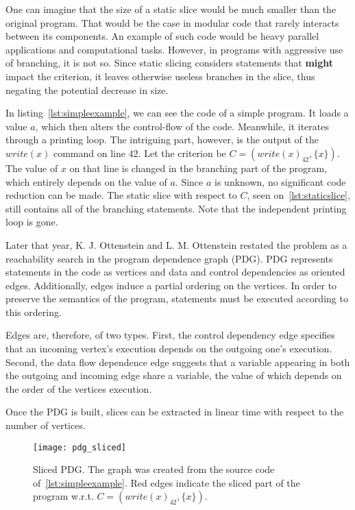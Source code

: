 One can imagine that the size of a static slice would be much smaller
than the original program. 
That would be the case in modular code that rarely interacts between
its components. 
An example of such code would be heavy parallel applications and 
computational tasks. 
However, in programs with aggressive use of branching, it is not so. 
Since static slicing considers statements that \textbf{might} 
impact the criterion, it leaves otherwise useless branches in the slice,
thus negating the potential decrease in size. 

In listing~\ref{lst:simpleexample}, we can see the code of a simple program.
It loads a value $a$, which then alters the control-flow of the code.
Meanwhile, it iterates through a printing loop. 
The intriguing part, however, is the output of the $write(x)$ 
command on line $42$. 
Let the criterion be $C = (write(x)_{42}, \{x\})$. 
The value of $x$ on that line is changed in the branching 
part of the program, which entirely depends on the value of $a$.
Since $a$ is unknown, no significant code reduction can be made. 
The static slice with respect to $C$, seen on~\ref{lst:staticslice}, 
still contains all of the branching statements. 
Note that the independent printing loop is gone.

Later that year, K. J. Ottenstein and L. M. Ottenstein \citep*{Ottenstein84}
restated the problem as a reachability
search in the program dependence graph (PDG).
PDG represents statements in the code as vertices and data and control
dependencies as oriented edges. 
Additionally, edges induce a partial ordering on the vertices. 
In order to preserve the semantics of the program, statements must be executed 
according to this ordering. 

Edges are, therefore, of two types. 
First, the control dependency edge specifies that an incoming vertex's 
execution depends on the outgoing one's execution. 
Second, the data flow dependence edge suggests that a variable appearing
in both the outgoing and incoming edge share a variable,
the value of which depends on the order of the vertices execution.

Once the PDG is built, slices can be extracted in linear time 
with respect to the number of vertices.

\begin{figure}[h]\centering
\texttt{[image: pdg\_sliced]}
\caption{Sliced PDG. The graph was created from the source 
code of~\ref{lst:simpleexample}.
Red edges indicate the sliced part of the program w.r.t.
$C = (write(x)_{42}, \{x\})$.}
\label{img:pdg}
\end{figure}

